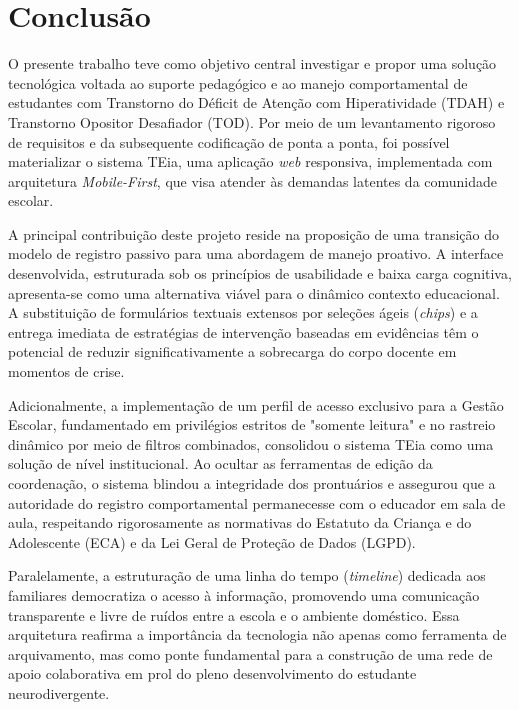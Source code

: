 \chapter{Conclusão}
\label{chap:conclusão}

O presente trabalho teve como objetivo central investigar e propor uma solução tecnológica voltada ao suporte pedagógico e ao manejo comportamental de estudantes com Transtorno do Déficit de Atenção com Hiperatividade (TDAH) e Transtorno Opositor Desafiador (TOD). Por meio de um levantamento rigoroso de requisitos e da subsequente codificação de ponta a ponta, foi possível materializar o sistema TEia, uma aplicação \textit{web} responsiva, implementada com arquitetura \textit{Mobile-First}, que visa atender às demandas latentes da comunidade escolar.

A principal contribuição deste projeto reside na proposição de uma transição do modelo de registro passivo para uma abordagem de manejo proativo. A interface desenvolvida, estruturada sob os princípios de usabilidade e baixa carga cognitiva, apresenta-se como uma alternativa viável para o dinâmico contexto educacional. A substituição de formulários textuais extensos por seleções ágeis (\textit{chips}) e a entrega imediata de estratégias de intervenção baseadas em evidências têm o potencial de reduzir significativamente a sobrecarga do corpo docente em momentos de crise.

Adicionalmente, a implementação de um perfil de acesso exclusivo para a Gestão Escolar, fundamentado em privilégios estritos de "somente leitura" e no rastreio dinâmico por meio de filtros combinados, consolidou o sistema TEia como uma solução de nível institucional. Ao ocultar as ferramentas de edição da coordenação, o sistema blindou a integridade dos prontuários e assegurou que a autoridade do registro comportamental permanecesse com o educador em sala de aula, respeitando rigorosamente as normativas do Estatuto da Criança e do Adolescente (ECA) e da Lei Geral de Proteção de Dados (LGPD).

Paralelamente, a estruturação de uma linha do tempo (\textit{timeline}) dedicada aos familiares democratiza o acesso à informação, promovendo uma comunicação transparente e livre de ruídos entre a escola e o ambiente doméstico. Essa arquitetura reafirma a importância da tecnologia não apenas como ferramenta de arquivamento, mas como ponte fundamental para a construção de uma rede de apoio colaborativa em prol do pleno desenvolvimento do estudante neurodivergente.

